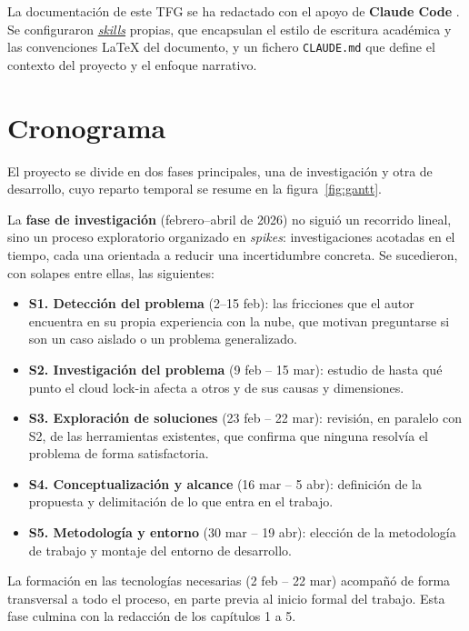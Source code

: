 La documentación de este TFG se ha redactado con el apoyo de \textbf{Claude Code}
\cite{claudeCode}. Se configuraron \hyperlink{skill}{\textit{skills}} propias, que encapsulan el estilo 
de escritura académica y las convenciones LaTeX del documento, y un fichero \texttt{CLAUDE.md} 
que define el contexto del proyecto y el enfoque narrativo.

\section{Cronograma}

El proyecto se divide en dos fases principales, una de investigación y otra de
desarrollo, cuyo reparto temporal se resume en la figura~\ref{fig:gantt}.

La \textbf{fase de investigación} (febrero–abril de 2026) no siguió un recorrido
lineal, sino un proceso exploratorio organizado en \textit{spikes}: investigaciones
acotadas en el tiempo, cada una orientada a reducir una incertidumbre concreta. Se
sucedieron, con solapes entre ellas, las siguientes:

\begin{itemize}
    \item \textbf{S1. Detección del problema} (2--15 feb): las fricciones que el autor
    encuentra en su propia experiencia con la nube, que motivan preguntarse si son un
    caso aislado o un problema generalizado.

    \item \textbf{S2. Investigación del problema} (9 feb -- 15 mar): estudio de hasta
    qué punto el cloud lock-in afecta a otros y de sus causas y dimensiones.

    \item \textbf{S3. Exploración de soluciones} (23 feb -- 22 mar): revisión, en
    paralelo con S2, de las herramientas existentes, que confirma que ninguna resolvía
    el problema de forma satisfactoria.

    \item \textbf{S4. Conceptualización y alcance} (16 mar -- 5 abr): definición de la
    propuesta y delimitación de lo que entra en el trabajo.

    \item \textbf{S5. Metodología y entorno} (30 mar -- 19 abr): elección de la
    metodología de trabajo y montaje del entorno de desarrollo.
\end{itemize}

La formación en las tecnologías necesarias (2 feb -- 22 mar) acompañó de forma
transversal a todo el proceso, en parte previa al inicio formal del trabajo. Esta fase
culmina con la redacción de los capítulos 1 a 5.

